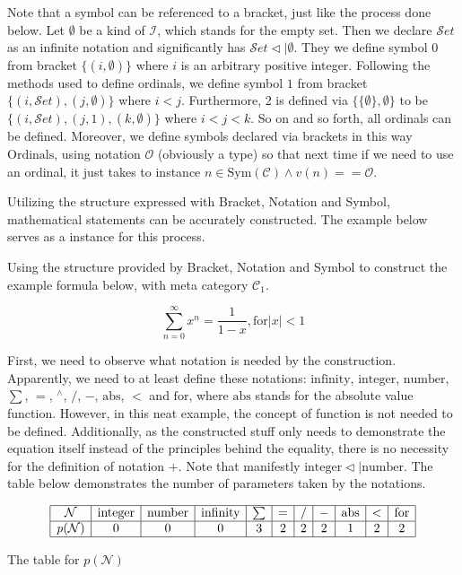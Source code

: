 \documentclass{article}
\begin{document}
Note that a symbol can be referenced to a bracket, just like the process done below. Let \(\emptyset\) be a kind of \(\mathcal{I}\), which stands for the empty set. Then we declare \(\mathcal{S}\mathit{e}\mathit{t}\) as an infinite notation and significantly has \(\mathcal{S}\mathit{e}\mathit{t}\triangleleft |\emptyset\). They we define symbol \(0\) from bracket \(\{(i,\emptyset )\}\) where \(i\) is an arbitrary positive integer. Following the methods used to define ordinals, we define symbol \(1\) from bracket \(\{(i,\mathcal{S}\mathit{e}\mathit{t}),(j,\emptyset )\}\) where \(i<j\). Furthermore, 2 is defined via \(\{\{\emptyset \},\emptyset \}\) to be \(\{(i,\mathcal{S}\mathit{e}\mathit{t}),(j,1),(k,\emptyset )\}\) where \(i<j<k\). So on and so forth, all ordinals can be defined. Moreover, we define symbols declared via brackets in this way \(\text{Ordinals}\), using notation \(\mathcal{O}\) (obviously a type) so that next time if we need to use an ordinal, it just takes to instance \(n\in \text{Sym}(\mathcal{C})\land \mathit{v}(n)==\mathcal{O}\).

Utilizing the structure expressed with Bracket, Notation and Symbol, mathematical statements can be accurately constructed. The example below serves as a instance for this process.

 Using the structure provided by Bracket, Notation and Symbol to construct the example formula below, with meta category \(\mathcal{C}_1\).

\[\sum _{n=0}^{\infty } x^n=\frac{1}{1-x}, \text{for} |x|<1\]

First, we need to observe what notation is needed by the construction. Apparently, we need to at least define these notations: \(\text{infinity}\), \(\text{integer}\), \(\text{number}\),\textit{  }\textit{ \(\sum\)}, \(=\), \({}^{\wedge}\), \(/\), \(-\), \(\text{abs}\), \(<\) and \(\text{for}\), where \(\text{abs}\) stands for the absolute value function. However, in this neat example, the concept of function is not needed to be defined. Additionally, as the constructed stuff only needs to demonstrate the equation itself instead of the principles behind the equality, there is no necessity for the definition of notation \(+\). Note that manifestly \(\text{integer} \triangleleft | \text{number}\). The table below demonstrates the number of parameters taken by the notations.

\begin{table}
	\centering
	\[\begin{array}{|c|c|c|c|c|c|c|c|c|c|c|}
		\hline
		\mathcal{N} & \text{integer} & \text{number} & \text{infinity} & \sum  & = & / & - & \text{abs} & < & \text{for} \\
		\hline
		\mathit{p}(\mathcal{N}) & 0 & 0 & 0 & 3 & 2 & 2 & 2 & 1 & 2 & 2 \\
		\hline
	\end{array}\]
	\caption{The table for $\mathit{p}(\mathcal{N})$}
\end{table}
\end{document}
